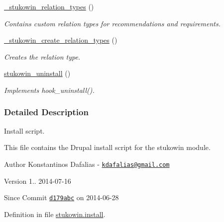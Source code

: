 \begin{DoxyCompactItemize}
\hyperlink{group___stukowin___module_gae7b4c9b6b19887d0ccc914b2886010ce}{\+\_\+stukowin\+\_\+relation\+\_\+types} ()
\begin{DoxyCompactList}\small\item\em Contains custom relation types for recommendations and requirements. \end{DoxyCompactList}\item 
\hyperlink{group___stukowin___module_gac59bc3fe951ab5625be92cfbff7e3dc4}{\+\_\+stukowin\+\_\+create\+\_\+relation\+\_\+types} ()
\begin{DoxyCompactList}\small\item\em Creates the relation type. \end{DoxyCompactList}\item 
\hyperlink{group___stukowin___module_gad831696eae7eb1a0e48c4e9621323bca}{stukowin\+\_\+uninstall} ()
\begin{DoxyCompactList}\small\item\em Implements hook\+\_\+uninstall(). \end{DoxyCompactList}\end{DoxyCompactItemize}


\subsubsection{Detailed Description}
Install script. 

This file contains the Drupal install script for the stukowin module.

\begin{DoxyAuthor}{Author}
Konstantinos Dafalias -\/ \href{mailto:kdafalias@gmail.com}{\tt kdafalias@gmail.\+com} 
\end{DoxyAuthor}
\begin{DoxyVersion}{Version}
1.. 2014-\/07-\/16 
\end{DoxyVersion}
\begin{DoxySince}{Since}
Commit \href{http://github.com/TheJake123/DrupalModul/commit/d179abcc5e05743086cd67cf1ce30b08923a7183}{\tt d179abc} on 2014-\/06-\/28 
\end{DoxySince}


Definition in file \hyperlink{stukowin_8install_source}{stukowin.\+install}.

